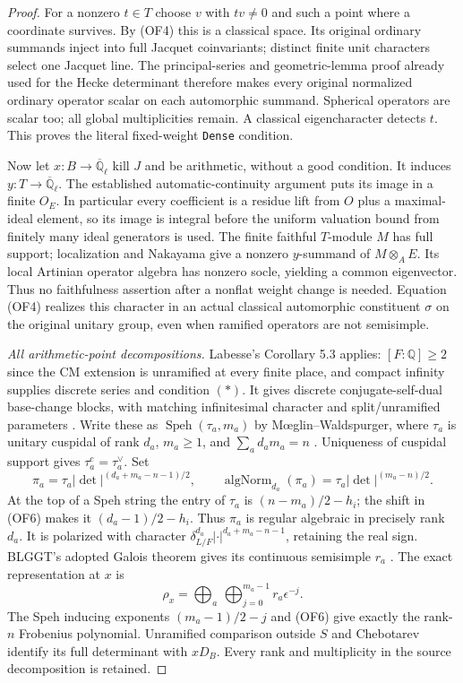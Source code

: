 \begin{proof}
For a nonzero $t\in T$ choose $v$ with $tv\ne0$ and such a point
where a coordinate survives.  By (OF4) this is a classical space.
Its original ordinary summands inject into full Jacquet coinvariants;
distinct finite unit characters select one Jacquet line.  The
principal-series and geometric-lemma proof already used for the
Hecke determinant therefore makes every original normalized ordinary
operator scalar on each automorphic summand.  Spherical operators
are scalar too; all global multiplicities remain.  A classical
eigencharacter detects $t$.  This proves the literal fixed-weight
\texttt{Dense} condition.

Now let $x:B\to\overline{\mathbb Q}_\ell$ kill $J$ and be arithmetic,
without a good condition.  It induces $y:T\to\overline{\mathbb Q}_\ell$.
The established automatic-continuity argument puts its image in a
finite $O_E$.  In particular every coefficient is a residue lift from
$O$ plus a maximal-ideal element, so its image is integral before the
uniform valuation bound from finitely many ideal generators is used.
The finite faithful $T$-module $M$ has full support; localization and
Nakayama give a nonzero $y$-summand of $M\otimes_A E$.
Its local Artinian operator algebra has nonzero socle, yielding a
common eigenvector.  Thus no faithfulness assertion after a nonflat
weight change is needed.  Equation (OF4) realizes this character in
an actual classical automorphic constituent $\sigma$ on the original
unitary group, even when ramified operators are not semisimple.

\emph{All arithmetic-point decompositions.}
Labesse's Corollary 5.3 applies: $[F:\mathbb Q]\ge2$ since the CM
extension is unramified at every finite place, and compact infinity
supplies discrete series and condition $(*)$.
It gives discrete conjugate-self-dual base-change blocks, with matching
infinitesimal character and split/unramified parameters
\cite[Corollary 5.3]{SelmerFamiliesLabesse}.
Write these as $\operatorname{Speh}(\tau_a,m_a)$ by
M\oe glin--Waldspurger, where $\tau_a$ is unitary cuspidal of rank $d_a$,
$m_a\ge1$, and $\sum_a d_am_a=n$
\cite[pp.~605--607]{SelmerFamiliesMW}.  Uniqueness of cuspidal support
gives $\tau_a^c=\tau_a^\vee$.  Set
\[
 \pi_a=\tau_a|\det|^{(d_a+m_a-n-1)/2},\qquad
 \operatorname{algNorm}_{d_a}(\pi_a)
                 =\tau_a|\det|^{(m_a-n)/2}.             \tag{OF6}
\]
At the top of a Speh string the entry of $\tau_a$ is
$(n-m_a)/2-h_i$; the shift in (OF6) makes it $(d_a-1)/2-h_i$.
Thus $\pi_a$ is regular algebraic in precisely rank $d_a$.
It is polarized with character
$\delta_{L/F}^{d_a}|\cdot|^{d_a+m_a-n-1}$, retaining the real sign.
BLGGT's adopted Galois theorem gives its continuous semisimple $r_a$
\cite[Theorem 2.1.1]{SelmerFamiliesBLGGT}.  The exact representation
at $x$ is
\[
       \rho_x=\bigoplus_a\,
                   \bigoplus_{j=0}^{m_a-1}r_a\epsilon^{-j}.       \tag{OF7}
\]
The Speh inducing exponents $(m_a-1)/2-j$ and (OF6) give exactly
the rank-$n$ Frobenius polynomial.  Unramified comparison outside
$S$ and Chebotarev identify its full determinant with $xD_B$.
Every rank and multiplicity in the source decomposition is retained.


\end{proof}
